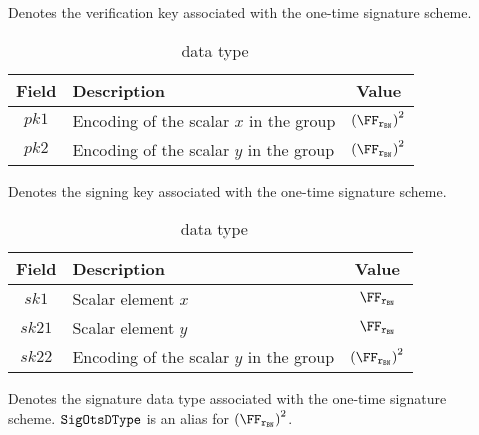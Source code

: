 \begin{description}
    \item[\vkOtsDType] Denotes the verification key associated with the one-time signature scheme.
        \begin{table}[H]
        \centering
        \begin{tabular}{cp{20em}c}
            Field & Description & Value\\ \toprule
            $pk1$ & Encoding of the scalar $x$ in the group & ${(\FFx{\rBN})}^{2}$ \\ \midrule
            $pk2$ & Encoding of the scalar $y$ in the group & ${(\FFx{\rBN})}^{2}$ \\ \bottomrule
        \end{tabular}
        \caption{\vkOtsDType~data type}\label{instantiation:tab:vk-ots-dtype}
        \end{table}
    \item[\skOtsDType] Denotes the signing key associated with the one-time signature scheme.
        \begin{table}[H]
        \centering
        \begin{tabular}{cp{20em}c}
            Field & Description & Value\\ \toprule
            $sk1$ & Scalar element $x$ & $\FFx{\rBN}$ \\ \midrule
            $sk21$ & Scalar element $y$ & $\FFx{\rBN}$ \\ \midrule
            $sk22$ & Encoding of the scalar $y$ in the group & ${(\FFx{\rBN})}^{2}$ \\ \bottomrule
        \end{tabular}
        \caption{\skOtsDType~data type}\label{instantiation:tab:sk-ots-dtype}
        \end{table}
    \item[\sigOtsDType] Denotes the signature data type associated with the one-time signature scheme. ${\mathtt{SigOtsDType}}$ is an alias for ${(\FFx{\rBN})}^{2}$.
\end{description}
